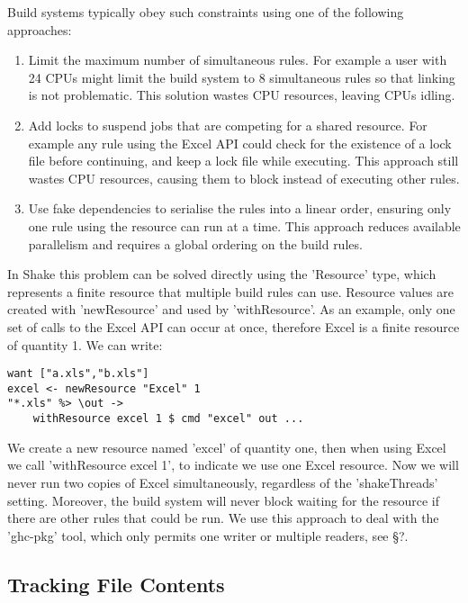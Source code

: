 Build systems typically obey such constraints using one of the following approaches:

\begin{enumerate}
\item Limit the maximum number of simultaneous rules. For example a user with 24 CPUs might limit the build system to 8 simultaneous rules so that linking is not problematic. This solution wastes CPU resources, leaving CPUs idling.
\item Add locks to suspend jobs that are competing for a shared resource. For example any rule using the Excel API could check for the existence of a lock file before continuing, and keep a lock file while executing. This approach still wastes CPU resources, causing them to block instead of executing other rules.
\item Use fake dependencies to serialise the rules into a linear order, ensuring only one rule using the resource can run at a time. This approach reduces available parallelism and requires a global ordering on the build rules.
\end{enumerate}

In Shake this problem can be solved directly using the \lst'Resource' type, which represents a finite resource that multiple build rules can use. Resource values are created with \lst'newResource' and used by \lst'withResource'. As an example, only one set of calls to the Excel API can occur at once, therefore Excel is a finite resource of quantity 1. We can write:

\begin{lstlisting}
want ["a.xls","b.xls"]
excel <- newResource "Excel" 1
"*.xls" %> \out ->
    withResource excel 1 $ cmd "excel" out ...
\end{lstlisting}

We create a new resource named \lst'excel' of quantity one, then when using Excel we call \lst'withResource excel 1', to indicate we use one Excel resource. Now we will never run two copies of Excel simultaneously, regardless of the \lst'shakeThreads' setting. Moreover, the build system will never block waiting for the resource if there are other rules that could be run. We use this approach to deal with the \lst'ghc-pkg' tool, which only permits one writer or multiple readers, see \S?.

\subsection{Tracking File Contents\label{sec:file-contents}}

